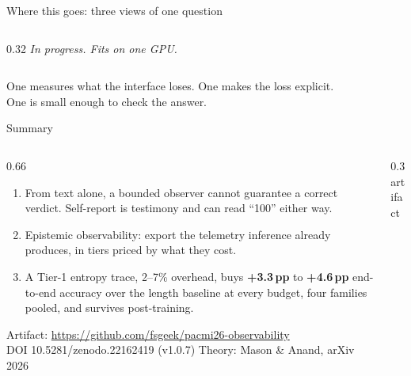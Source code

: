 \documentclass[aspectratio=169,10pt]{beamer}
\newcommand{\pp}[1]{\textbf{#1\,pp}}
\begin{document}
\begin{frame}{Where this goes: three views of one question}
\begin{columns}[T]
\begin{column}{0.32\textwidth}
      \vspace{0.2em}
      \small\textit{In progress. Fits on one GPU.}
    \end{column}
  \end{columns}
  \vspace{1.2em}
  \centering
  One measures what the interface loses. One makes the loss explicit.\\
  One is small enough to check the answer.
\end{frame}

\begin{frame}{Summary}
  \begin{columns}[T]
    \begin{column}{0.66\textwidth}
      \begin{enumerate}
        \item From text alone, a bounded observer cannot guarantee a correct
          verdict. Self-report is testimony and can read ``100'' either way.
        \item Epistemic observability: export the telemetry inference already
          produces, in tiers priced by what they cost.
        \item A Tier-1 entropy trace, 2--7\% overhead, buys \pp{+3.3} to \pp{+4.6}
          end-to-end accuracy over the length baseline at every budget, four
          families pooled, and survives post-training.
      \end{enumerate}
      \vspace{0.5em}
      \scriptsize
      Artifact: \url{https://github.com/fsgeek/pacmi26-observability}\\
      DOI 10.5281/zenodo.22162419 (v1.0.7) \quad Theory: Mason \& Anand, arXiv 2026
    \end{column}
    \begin{column}{0.3\textwidth}
      \centering
      \\
      \scriptsize artifact
    \end{column}
  \end{columns}
\end{frame}
\end{document}
